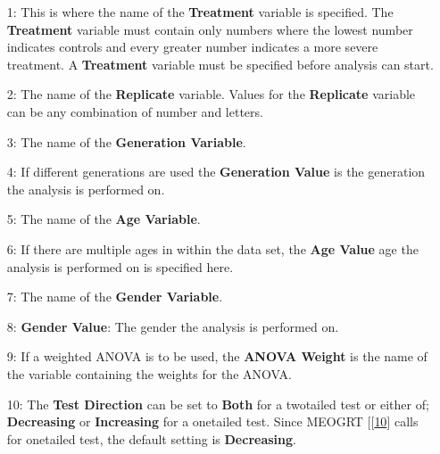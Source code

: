 \documentclass[a4paper]{article}
\begin{document}
\begin{enumerate}

\item[\begingroup\color{red}1:\endgroup] This is where the name of the \textbf{Treatment} variable is specified. 
	The \textbf{Treatment} variable must contain only numbers where the lowest number indicates controls and 
	every greater number indicates a more severe treatment. 
	A \textbf{Treatment} variable must be specified before analysis can start. 

	
\item[\begingroup\color{red}2:\endgroup] The name of the \textbf{Replicate} variable. Values for the \textbf{Replicate} variable
	can be any combination of number and letters. 
 
\item[\begingroup\color{red}3:\endgroup] The name of the \textbf{Generation Variable}.

\item[\begingroup\color{red}4:\endgroup] If different generations are used the \textbf{Generation Value} is the generation the analysis is performed on. 
	
\item[\begingroup\color{red}5:\endgroup] The name of the \textbf{Age Variable}.

\item[\begingroup\color{red}6:\endgroup] If there are multiple ages in within the data set, the \textbf{Age Value} age the analysis is performed on is
	specified here.

\item[\begingroup\color{red}7:\endgroup] The name of the \textbf{Gender Variable}.

\item[\begingroup\color{red}8:\endgroup] \textbf{Gender Value}: The gender the analysis is performed on. 

\item[\begingroup\color{red}9:\endgroup] If a weighted ANOVA is to be used, the \textbf{ANOVA Weight} is the name of the variable 
	containing the weights for the ANOVA. 

\item[\begingroup\color{red}10:\endgroup] The \textbf{Test Direction} can be set to \textbf{Both} for a two\textendash{}tailed test or either of; 
	\textbf{Decreasing} or \textbf{Increasing} for a one\textendash{}tailed test.  Since MEOGRT [[\hyperlink{R10}{10}] calls for one\textendash{}tailed test, the default	
	setting is \textbf{Decreasing}.


\end{enumerate}
\end{document}
